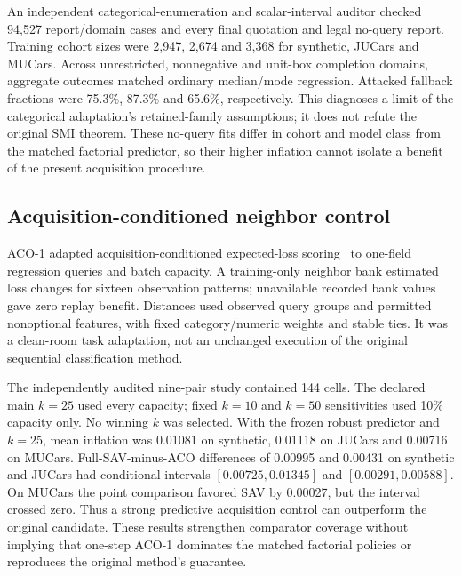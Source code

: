An independent categorical-enumeration and scalar-interval auditor checked
94,527 report/domain cases and every final quotation and legal no-query report.
Training cohort sizes were 2,947, 2,674 and 3,368 for synthetic, JUCars and
MUCars. Across unrestricted, nonnegative and unit-box completion domains,
aggregate outcomes matched ordinary median/mode regression. Attacked fallback
fractions were 75.3\%, 87.3\% and 65.6\%, respectively. This diagnoses a limit
of the categorical adaptation's retained-family assumptions; it does not
refute the original SMI theorem. These no-query fits differ in cohort and
model class from the matched factorial predictor, so their higher inflation
cannot isolate a benefit of the present acquisition procedure.

\subsection{Acquisition-conditioned neighbor control}
ACO-1 adapted acquisition-conditioned expected-loss scoring~\cite{activeoracle}
to one-field regression queries and batch capacity. A training-only neighbor
bank estimated loss changes for sixteen observation patterns; unavailable
recorded bank values gave zero replay benefit. Distances used observed query
groups and permitted nonoptional features, with fixed category/numeric weights
and stable ties. It was a clean-room task adaptation, not an unchanged execution
of the original sequential classification method.

The independently audited nine-pair study contained 144 cells. The declared
main $k=25$ used every capacity; fixed $k=10$ and $k=50$ sensitivities used
10\% capacity only. No winning $k$ was selected. With the frozen robust
predictor and $k=25$, mean inflation was 0.01081 on synthetic, 0.01118 on
JUCars and 0.00716 on MUCars. Full-SAV-minus-ACO differences of 0.00995 and
0.00431 on synthetic and JUCars had conditional intervals
$[0.00725,0.01345]$ and $[0.00291,0.00588]$. On MUCars the point comparison
favored SAV by 0.00027, but the interval crossed zero. Thus a strong predictive
acquisition control can outperform the original candidate. These results
strengthen comparator coverage without implying that one-step ACO-1 dominates
the matched factorial policies or reproduces the original method's guarantee.
